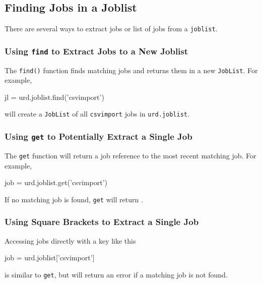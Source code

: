 \subsection{Finding Jobs in a Joblist}
There are several ways to extract jobs or list of jobs from
a \texttt{joblist}.


\subsubsection*{Using \texttt{find} to Extract Jobs to a New Joblist}
The \texttt{find()} function finds matching jobs and returns them in a
new \texttt{JobList}.  For example,
\begin{python}
jl = urd.joblist.find('csvimport')
\end{python}
will create a \texttt{JobList} of all \texttt{csvimport} jobs
in \texttt{urd.joblist}.


\subsubsection*{Using \texttt{get} to Potentially Extract a Single Job}
The \texttt{get} function will return a job reference to the most
recent matching job.  For example,
\begin{python}
job = urd.joblist.get('csvimport')
\end{python}
If no matching job is found, \texttt{get} will return \pyNone.


\subsubsection*{Using Square Brackets to Extract a Single Job}
Accessing jobs directly with a key like this
\begin{python}
job = urd.joblist['csvimport']
\end{python}
is similar to \texttt{get}, but will return an error if a matching job
is not found.



